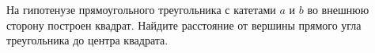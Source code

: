 \begin{ex}
	\begin{condition}
		На гипотенузе прямоугольного треугольника с катетами \( a  \) и \( b  \) во внешнюю сторону построен квадрат. Найдите расстояние от вершины прямого угла треугольника до центра	квадрата.
	\end{condition}
\end{ex}